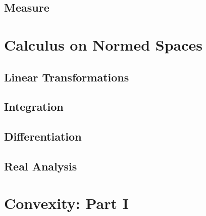 \documentclass[crop=false,class=book]{standalone}
\theoremstyle{mystyle}
\begin{document}
\subsection{Measure}
\section{Calculus on Normed Spaces}
\subsection{Linear Transformations}
\subsection{Integration}
\subsection{Differentiation}
\subsection{Real Analysis}
\section{Convexity: Part I}
\end{document}
